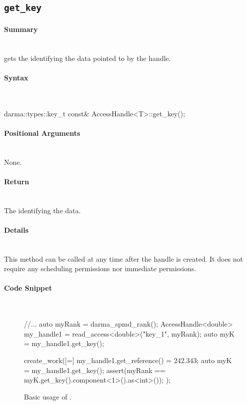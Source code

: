 \subsection{\texttt{get\_key}}

\paragraph{Summary}\mbox{}\\ 
 gets the  identifying the data pointed to by
the \gls{handle}.

\paragraph{Syntax}\mbox{}\\ 
\begin{CppCode}
darma::types::key_t const& AccessHandle<T>::get_key();
\end{CppCode}

\paragraph{Positional Arguments}\mbox{}\\ 
None.

\paragraph{Return}\mbox{}\\ 
The  identifying the data.

\paragraph{Details}\mbox{}\\ 
This method can be called at any time after the \gls{handle} is created.  It does not
require any \gls{scheduling permissions} nor \gls{immediate permissions}.

\paragraph{Code Snippet}\mbox{}\\ 
\begin{figure}[!h]
\begin{CppCodeNumb}
//...
auto myRank = darma_spmd_rank();
AccessHandle<double> my_handle1 = read_access<double>("key_1", myRank);
auto myK = my_handle1.get_key();

create_work([=]{
	my_handle1.get_reference() = 242.343;
	auto myK = my_handle1.get_key();
	assert(myRank == myK.get_key().component<1>().as<int>());
});
\end{CppCodeNumb}
\label{fig:fe_api_get_key}
\caption{Basic usage of \protect{}.}
\end{figure}




